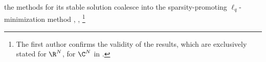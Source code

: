 the methods for
its stable solution coalesce into
the sparsity-promoting $\ell_{q}$-minimization method
\cite[(1.11) and (1.12)]{book:Eldar2012},
\cite[(2) and (11)]{article:TroppPIEEE2010},
\cite[($\text{P}_{q, \theta}$)]{article:FoucartACHA2009}%
\footnote{
  The first author confirms
  the validity of
  the results, which are exclusively stated for
  $\R^{N}$, for
  $\C^{N}$ in
  \cite{article:FoucartACHA2010}.
}
